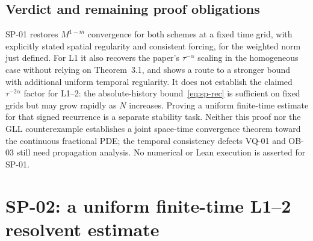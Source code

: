 \documentclass[11pt,a4paper]{amsart}
\theoremstyle{remark}
\theoremstyle{plain}
\theoremstyle{remark}
\numberwithin{equation}{section}
\begin{document}
\subsection{Verdict and remaining proof obligations}
SP-01 restores $M^{1-m}$ convergence for both schemes at a fixed time grid, with explicitly stated spatial regularity and consistent forcing, for the weighted norm just defined. For L1 it also recovers the paper's $\tau^{-\alpha}$ scaling in the homogeneous case without relying on Theorem~3.1, and shows a route to a stronger bound with additional uniform temporal regularity. It does not establish the claimed $\tau^{-2\alpha}$ factor for L1--2: the absolute-history bound~\eqref{eq:sp-rec} is sufficient on fixed grids but may grow rapidly as $N$ increases. Proving a uniform finite-time estimate for that signed recurrence is a separate stability task. Neither this proof nor the GLL counterexample establishes a joint space-time convergence theorem toward the continuous fractional PDE; the temporal consistency defects VQ-01 and OB-03 still need propagation analysis. No numerical or Lean execution is asserted for SP-01.


\section{SP-02: a uniform finite-time L1--2 resolvent estimate}
\label{sec:sp02}
\end{document}

